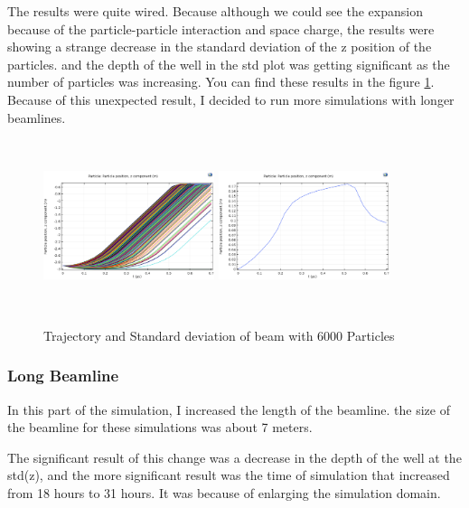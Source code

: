 \documentclass[12pt,a4paper]{article}
\begin{document}
The results were quite wired. Because although we could see the expansion because of the particle-particle interaction and space charge, the results were showing a strange decrease in the standard deviation of the z position of the particles. and the depth of the well in the std plot was getting significant as the number of particles was increasing. You can find these results in the figure \ref{short}. Because of this unexpected result, I decided to run more simulations with longer beamlines.



\begin{figure}[h!]
\centering
\includegraphics[width=50mm, height=50mm]{sim-in-6000}
\includegraphics[width=50mm, height=50mm]{sim-std-6000}
\caption{Trajectory and Standard deviation of beam with 6000 Particles}
\label{short}
\end{figure}

\subsubsection{Long Beamline}
In this part of the simulation, I increased the length of the beamline. the size of the beamline for these simulations was about 7 meters. 

The significant result of this change was a decrease in the depth of the well at the std(z), and the more significant result was the time of simulation that increased from 18 hours to 31 hours. It was because of enlarging the simulation domain.
\end{document}
